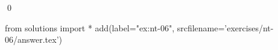 
\begin{ex} 
  \label{ex:nt-06}
  
  \qed
\end{ex} 
\begin{python0}
from solutions import *
add(label="ex:nt-06",
    srcfilename='exercises/nt-06/answer.tex') 
\end{python0}
